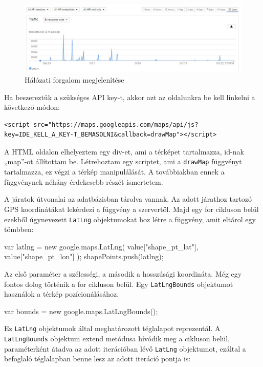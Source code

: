 \begin{figure}[h!]
\centering
\includegraphics[scale=0.5]{kepek/google_maps_api_2.jpg}
\caption{Hálózati forgalom megjelenítése}
\label{fig:google_maps_api_2}
\end{figure}

Ha beszereztük a szükséges API key-t, akkor azt az oldalunkra be kell linkelni a következő módon:

\begin{verbatim}
<script src="https://maps.googleapis.com/maps/api/js?
key=IDE_KELL_A_KEY-T_BEMASOLNI&callback=drawMap"></script>
\end{verbatim}

A HTML oldalon elhelyeztem egy div-et, ami a térképet tartalmazza, id-nak „map”-ot állítottam be. Létrehoztam egy scriptet, ami a \texttt{drawMap} függvényt tartalmazza, ez végzi a térkép manipulálását. A továbbiakban ennek a függvénynek néhány érdekesebb részét ismertetem.

A járatok útvonalai az adatbázisban tárolva vannak. Az adott járathoz tartozó GPS koordinátákat lekérdezi a függvény a szervertől. Majd egy for cikluson belül ezekből úgynevezett \texttt{LatLng} objektumokat hoz létre a függvény, amit eltárol egy tömbben:

\begin{cpp}
var latlng = new google.maps.LatLng(
    value["shape_pt_lat"],
    value["shape_pt_lon"]
);
shapePoints.push(latlng);
\end{cpp}

Az első paraméter a szélességi, a második a hosszúsági koordináta. Még egy fontos dolog történik a for cikluson belül. Egy \texttt{LatLngBounds} objektumot használok a térkép pozícionálásához.

\begin{cpp}
var bounds = new google.maps.LatLngBounds();
\end{cpp}

Ez \texttt{LatLng} objektumok által meghatározott téglalapot reprezentál. A \texttt{LatLngBounds} objektum extend metódusa hívódik meg a cikluson belül, paraméterként átadva az adott iterációban lévő \texttt{LatLng} objektumot, ezáltal a befoglaló téglalapban benne lesz az adott iteráció pontja is:

